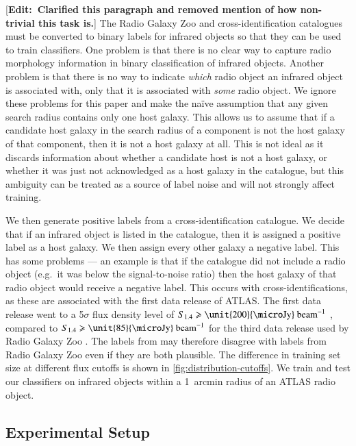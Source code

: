 \documentclass[fleqn,usenatbib,usedcolumn]{mnras}
\newcommand{\jansky}{\text{Jy}}
\newcommand{\edit}[1]{ {\color{red}[{\bf Edit:~{#1}}]} }
\begin{document}
    \edit{Clarified this paragraph and removed mention of how non-trivial this task is.} The Radio Galaxy Zoo and \citet{norris06} cross-identification catalogues must be converted to binary labels for infrared objects so that they can be used to train classifiers. One problem is that there is no clear way to capture radio morphology information in binary classification of infrared objects. Another problem is that there is no way to indicate \emph{which} radio object an infrared object is associated with, only that it is associated with \emph{some} radio object. We ignore these problems for this paper and make the na\"ive assumption that any given search radius contains only one host galaxy. This allows us to assume that if a candidate host galaxy in the search radius of a component is not the host galaxy of that component, then it is not a host galaxy at all. This is not ideal as it discards information about whether a candidate host is not a host galaxy, or whether it was just not acknowledged as a host galaxy in the catalogue, but this ambiguity can be treated as a source of label noise and will not strongly affect training.

    We then generate positive labels from a cross-identification catalogue.
    We decide that if an infrared object is listed in the catalogue, then it
    is assigned a positive label as a host galaxy. We then assign every other galaxy a negative label. This has some problems
    --- an example is that if the catalogue did not include a radio
    object (e.g.~it was below the signal-to-noise ratio) then the host galaxy
    of that radio object would receive a negative label. This occurs with
    \citet{norris06} cross-identifications, as these are associated with the
    first data release of ATLAS. The first data release went to a 5$\sigma$
    flux density level of $S_{1.4} \geq \unit{200}{\micro\jansky}\text{
    beam}^{-1}$ \citep{norris06}, compared to $S_{1.4} \geq \unit{85}{\micro\jansky}\text{
    beam}^{-1}$ for the third data release used by Radio Galaxy Zoo
    \citep{franzen15}. The labels from \citet{norris06} may therefore disagree with labels
    from Radio Galaxy Zoo even if they are both plausible. The difference in
    training set size at different flux cutoffs is shown in
    \autoref{fig:distribution-cutoffs}. We train and test our classifiers on
    infrared objects within a 1~arcmin radius of an ATLAS radio object.

  \subsection{Experimental Setup}
  \label{sec:experimental-setup}
\end{document}
